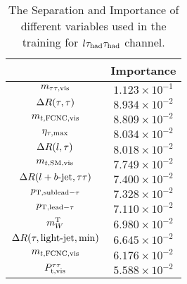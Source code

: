\begin{table}
\caption{The Separation and Importance of different variables used in the training for $l\tau_\text{had}{}\tau_\text{had}$ channel.}
\centering
\begin{tabular}{|c|c|} \hline
 & Importance \\ \hline
$m_{\tau\tau,\text{vis}}   $ & $1.123\times10^{-1}$ \\
$\Delta R(\tau,\tau)    $ & $8.934\times10^{-2}$ \\
$m_{t,\text{FCNC,vis}}    $ & $8.809\times10^{-2}$ \\
$\eta_{\tau,\text{max}}       $ & $8.034\times10^{-2}$ \\
$\Delta R(l,\tau)       $ & $8.018\times10^{-2}$ \\
$m_{t,\text{SM,vis}}   $ & $7.749\times10^{-2}$ \\
$\Delta R(l+b\text{-jet},\tau\tau)    $ & $7.400\times10^{-2}$ \\
$p_{\text{T},\text{sublead}-\tau}      $ & $7.328\times10^{-2}$ \\
$p_{\text{T},\text{lead}-\tau}      $ & $7.110\times10^{-2}$ \\
$m^{\text{T}}_{W}          $ & $6.980\times10^{-2}$ \\
$\Delta R(\tau,\text{light-jet},\text{min})   $ & $6.645\times10^{-2}$ \\
$m_{t,\text{FCNC,vis}}   $ & $6.176\times10^{-2}$ \\
$P_{\text{t,vis}}^{\tau\tau} $ & $5.588\times10^{-2}$ \\ \hline

\end{tabular}
\label{tab:mva_sep_imp_lh_4j}
\end{table}

